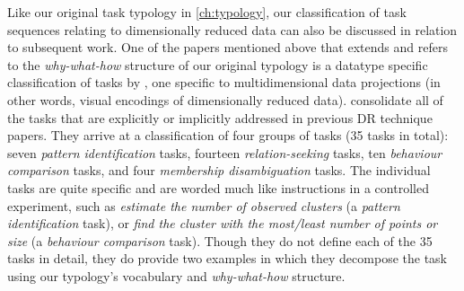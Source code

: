 Like our original task typology in \autoref{ch:typology}, our classification of task sequences relating to dimensionally reduced data can also be discussed in relation to subsequent work.
One of the papers mentioned above that extends and refers to the {\it why-what-how} structure of our original typology is a datatype specific classification of tasks by \citet{Etemadpour2015}, one specific to multidimensional data projections (in other words, visual encodings of dimensionally reduced data).
\citet{Etemadpour2015} consolidate all of the tasks that are explicitly or implicitly addressed in previous \ac{DR} technique papers. 
They arrive at a classification of four groups of tasks (35 tasks in total): 
seven {\it pattern identification} tasks, fourteen {\it relation-seeking} tasks, ten {\it behaviour comparison} tasks, and four {\it membership disambiguation} tasks. 
The individual tasks are quite specific and are worded much like instructions in a controlled experiment, such as {\it estimate the number of observed clusters} (a {\it pattern identification} task), or {\it find the cluster with the most/least number of points or size} (a {\it behaviour comparison} task).
Though they do not define each of the 35 tasks in detail, they do provide two examples in which they decompose the task using our typology's vocabulary and {\it why-what-how} structure.

